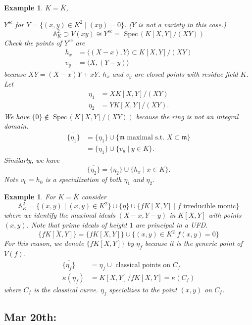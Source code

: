 \documentclass[11pt]{article}
\newtheorem{ex}[thm]{Example}
\newcommand{\spec}{\text{ Spec}\,}
\newcommand{\affn}{\mathbb A}
\newcommand{\scm}{{\mathfrak m}}
\newcommand{\lgl}{\langle}
\newcommand{\rgl}{\rangle}
\begin{document}
\begin{ex}
$K=\overline{K}$, 

$Y^{sc}$ for $Y=\{(x,y)\in K^2 \mid (xy)=0\}$. ($Y$ is not a variety in this case.)
$$
\affn^2_K\supset V(xy)\cong Y^{sc}=\spec(K[X,Y]/(XY))
$$
Check the points of $Y^{sc}$ are
\begin{align*}
h_x & = \lgl (X-x), Y\rgl\subset K[X,Y]/(XY) \\
v_y & =\lgl X, (Y-y)\rgl
\end{align*}
because $XY=(X-x)Y+xY$.
$h_x$ and $v_y$ are closed points with residue field $K$.  Let
\begin{align*}
\eta_1 & =X K[X,Y]/(XY) \\
\eta_2 & =YK[X,Y]/(XY).
\end{align*}
We have $\{0\}\notin \spec (K[X,Y]/(XY))$ because the ring is not an integral domain.
$$
\begin{aligned}
\overline{\{\eta_1\}}&=\{\eta_1\}\cup \{\scm \text{ maximal s.t. } X\subset \scm\}\\
&=\{\eta_1\}\cup \{v_y \mid y\in K\}.
\end{aligned}
$$
Similarly, we have
$$
\overline{\{\eta_2\}}=\{\eta_2\}\cup\{h_x \mid x\in K\}.
$$
Note $v_0=h_0$ is a specialization of both $\eta_1$ and $\eta_2$.
\end{ex}

\begin{ex}
For  $K=\overline{K}$ consider
 $$\affn^2_K=\{(x, y) \mid (x,y)\in K^2\} \cup \{\eta\}\cup \{fK[X,Y] \mid f \text{ irreducible monic}\}$$ 
 where we identify the maximal ideals $(X-x, Y-y)$ in $K[X,Y]$ with points $(x,y)$. 
Note that prime ideals of height $1$ are principal in a UFD.
$$
\overline{\{fK[X,Y]\}}=\{f K[X,Y]\}\cup \{(x,y)\in K^2|f(x,y)=0\}
$$
For this reason, we denote $\{fK[X,Y]\}$ by $\eta_f$ because it is the generic point of $V(f)$.
\begin{align*}
\overline{\{\eta_f\}} & =\eta_f\cup \text{ classical points on } C_f \\
\kappa(\eta_f) & =K[X,Y]/fK[X,Y]=\kappa(C_f) 
\end{align*}
where $C_f$ is the classical curve.
$\eta_f$ specializes to the point $(x,y)$ on $C_f$.

\end{ex}

\subsection{Mar 20th: }
\end{document}
